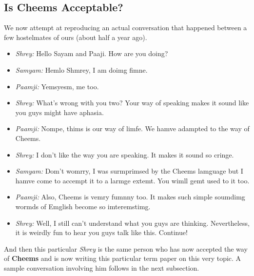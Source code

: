 \def\DevnagVersion{2.17}\documentclass{article}
\begin{document}
\subsection{Is Cheems Acceptable?}
We now attempt at reproducing an actual conversation that happened between a few hostelmates of ours (about half a year ago).
\begin{itemize}[label={}]
    \item \textit{Shrey:} Hello Sayam and Paaji. How are you doing?
    \item \textit{Samyam:} Hemlo Shmrey, I am doimg fimne.
    \item \textit{Paamji:} Yemsyesm, me too.
    \item \textit{Shrey:} What's wrong with you two? Your way of speaking makes it sound like you guys might have aphasia.
    \item \textit{Paamji:} Nompe, thims is our way of limfe. We hamve adampted to the way of Cheems.
    \item \textit{Shrey:} I don't like the way you are speaking. It makes it sound so cringe.
    \item \textit{Samyam:} Dom't womrry, I was surmprimsed by the Cheems lamguage but I hamve come to accempt it to a larmge extemt. You wimll gemt used to it too.
    \item \textit{Paamji:} Also, Cheems is vemry fumnny too. It makes such simple soumdimg wormds of Emglish become so imteremstimg.
    \item \textit{Shrey:} Well, I still can't understand what you guys are thinking. Nevertheless, it is weirdly fun to hear you guys talk like this. Continue!
\end{itemize}
And then this particular \textit{Shrey} is the same person who has now accepted the way of \textbf{Cheems} and is now writing this particular term paper on this very topic. A sample conversation involving him follows in the next subsection.
\end{document}
